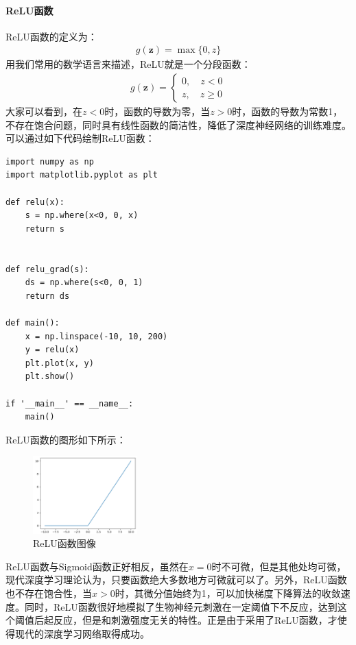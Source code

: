 \documentclass[UTF8]{article}
\begin{document}
\paragraph{ReLU函数}
ReLU函数的定义为：
\begin{equation}
\begin{aligned}
g(\boldsymbol{z})=\max\{ 0, z \}
\end{aligned}
\label{mlp-relu-def}
\end{equation}
用我们常用的数学语言来描述，ReLU就是一个分段函数：
\begin{equation}
\begin{aligned}
g(\boldsymbol{z})=
\begin{cases}
0, \quad z < 0 \\
z, \quad z \ge 0
\end{cases}
\end{aligned}
\label{mlp-relu-def-1}
\end{equation}
大家可以看到，在$z < 0$时，函数的导数为零，当$z>0$时，函数的导数为常数1，不存在饱合问题，同时具有线性函数的简洁性，降低了深度神经网络的训练难度。
可以通过如下代码绘制ReLU函数：
\begin{lstlisting}
import numpy as np
import matplotlib.pyplot as plt

def relu(x):
    s = np.where(x<0, 0, x)
    return s


def relu_grad(s):
    ds = np.where(s<0, 0, 1)
    return ds

def main():
    x = np.linspace(-10, 10, 200)
    y = relu(x)
    plt.plot(x, y)
    plt.show()

if '__main__' == __name__:
    main()
\end{lstlisting}
ReLU函数的图形如下所示：
\begin{figure}[H]
	\caption{ReLU函数图像}
	\label{f000036}
	\centering
	\includegraphics[height=3cm]{images/f000036}
\end{figure}
ReLU函数与Sigmoid函数正好相反，虽然在$x=0$时不可微，但是其他处均可微，现代深度学习理论认为，只要函数绝大多数地方可微就可以了。另外，ReLU函数也不存在饱合性，当$x>0$时，其微分值始终为1，可以加快梯度下降算法的收敛速度。同时，ReLU函数很好地模拟了生物神经元刺激在一定阈值下不反应，达到这个阈值后起反应，但是和刺激强度无关的特性。正是由于采用了ReLU函数，才使得现代的深度学习网络取得成功。
\end{document}
